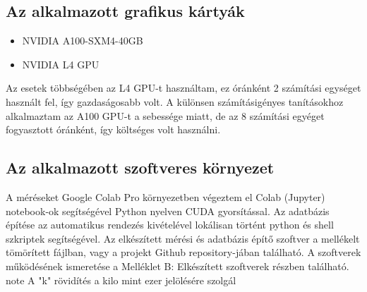 \documentclass[	
  noindent
]{elteikthesis}[2024/04/26]
\begin{document}
      \subsection{Az alkalmazott grafikus kártyák}
      \begin{itemize}
        \item NVIDIA A100-SXM4-40GB
        \item NVIDIA L4 GPU
      \end{itemize}
      Az esetek többségében az L4 GPU-t használtam, ez óránként 2 számítási egységet használt fel, így gazdaságosabb volt. A különsen számításigényes tanításokhoz alkalmaztam az A100 GPU-t a sebessége miatt, de az 8 számítási egyéget fogyasztott óránként, így költséges volt használni. 

    \subsection{Az alkalmazott szoftveres környezet}
      A méréseket Google Colab Pro környezetben végeztem el Colab (Jupyter) notebook-ok segítségével Python nyelven CUDA gyorsítással. Az adatbázis építése az automatikus rendezés kivételével lokálisan történt python és shell szkriptek segítségével. 
      Az elkészített mérési és adatbázis építő szoftver a mellékelt tömörített fájlban, vagy a projekt Github repository-jában található.
      A szoftverek működésének ismeretése a Melléklet B: Elkészített szoftverek részben található.
      note {A "k" rövidítés a kilo mint ezer jelölésére szolgál}
\end{document}
